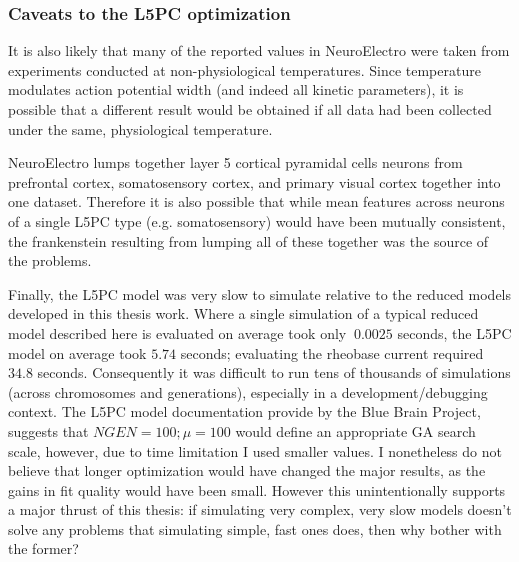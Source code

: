 \subsubsection{Caveats to the L5PC optimization}
It is also likely that many of the reported values in NeuroElectro were taken from experiments conducted at non-physiological temperatures.
Since temperature modulates action potential width \cite{goldin2017temperature} (and indeed all kinetic parameters), it is possible that a different result would be obtained if all data had been collected under the same, physiological temperature.

NeuroElectro lumps together layer 5 cortical pyramidal cells neurons from prefrontal cortex, somatosensory cortex, and primary visual cortex together into one dataset. 
Therefore it is also possible that while mean features across neurons of a single L5PC type (e.g. somatosensory) would have been mutually consistent, the frankenstein resulting from lumping all of these together was the source of the problems.

Finally, the L5PC model was very slow to simulate relative to the reduced models developed in this thesis work.
Where a single simulation of a typical reduced model described here is evaluated on average took only $~0.0025$ seconds, the L5PC model on average took $5.74$ seconds; evaluating the rheobase current required $34.8$ seconds.
Consequently it was difficult to run tens of thousands of simulations (across chromosomes and generations), especially in a development/debugging context.
The L5PC model documentation provide by the Blue Brain Project, suggests that $NGEN=100; \mu=100$ would define an appropriate GA search scale, however, due to time limitation I used smaller values. 
I nonetheless do not believe that longer optimization would have changed the major results, as the gains in fit quality would have been small.
However this unintentionally supports a major thrust of this thesis: if simulating very complex, very slow models doesn't solve any problems that simulating simple, fast ones does, then why bother with the former?


%



